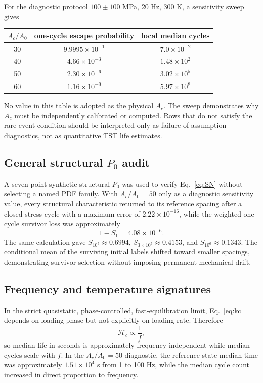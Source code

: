 \documentclass[11pt]{article}
\begin{document}
For the diagnostic protocol $100\pm100$ MPa, 20 Hz, 300 K, a sensitivity sweep gives
\begin{center}
\begin{tabular}{ccc}
\toprule
$A_c/A_0$ & one-cycle escape probability & local median cycles \\
\midrule
30 & $9.9995\times10^{-1}$ & $7.0\times10^{-2}$ \\
40 & $4.66\times10^{-3}$ & $1.48\times10^{2}$ \\
50 & $2.30\times10^{-6}$ & $3.02\times10^{5}$ \\
60 & $1.16\times10^{-9}$ & $5.97\times10^{8}$ \\
\bottomrule
\end{tabular}
\end{center}
No value in this table is adopted as the physical $A_c$. The sweep demonstrates why $A_c$ must be independently calibrated or computed. Rows that do not satisfy the rare-event condition should be interpreted only as failure-of-assumption diagnostics, not as quantitative TST life estimates.

\subsection{General structural $P_0$ audit}
A seven-point synthetic structural $P_0$ was used to verify Eq.~\eqref{eq:SN} without selecting a named PDF family. With $A_c/A_0=50$ only as a diagnostic sensitivity value, every structural characteristic returned to its reference spacing after a closed stress cycle with a maximum error of $2.22\times10^{-16}$, while the weighted one-cycle survivor loss was approximately
\begin{equation}
1-S_1=4.08\times10^{-6}.
\end{equation}
The same calculation gave $S_{10^5}\approx0.6994$, $S_{3\times10^5}\approx0.4153$, and $S_{10^6}\approx0.1343$. The conditional mean of the surviving initial labels shifted toward smaller spacings, demonstrating survivor selection without imposing permanent mechanical drift.

\subsection{Frequency and temperature signatures}
In the strict quasistatic, phase-controlled, fast-equilibration limit, Eq.~\eqref{eq:kc} depends on loading phase but not explicitly on loading rate. Therefore
\begin{equation}
\mathcal H_c\propto\frac1f,
\end{equation}
so median life in seconds is approximately frequency-independent while median cycles scale with $f$. In the $A_c/A_0=50$ diagnostic, the reference-state median time was approximately $1.51\times10^4$ s from 1 to 100 Hz, while the median cycle count increased in direct proportion to frequency.
\end{document}
